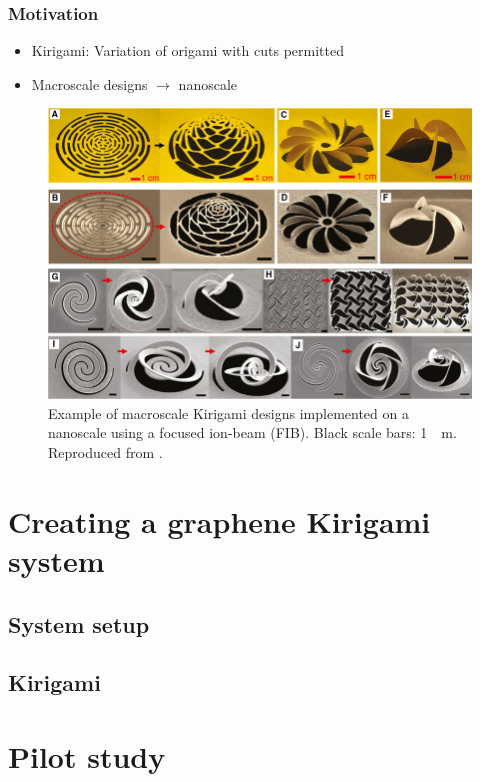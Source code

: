 \documentclass[UKenglish]{beamer}
\begin{document}
\begin{frame}
	\frametitle{Motivation}

	\begin{itemize}
		\item Kirigami: Variation of origami with cuts permitted
		\item Macroscale designs $\to$ nanoscale
	\end{itemize}
	\vspace*{10px}

	\begin{figure}
		\includegraphics[height=0.6\textheight]{figures/kirigami_example.jpg}
		\caption{Example of macroscale Kirigami designs implemented on a nanoscale using a focused ion-beam (FIB). Black scale bars: \SI{1}{\mu m}. Reproduced from \cite{Li_2018}.}
	\end{figure}	

\end{frame}

\section{Creating a graphene Kirigami system} %
\subsection{System setup}
\subsection{Kirigami}




\section{Pilot study} %
\end{document}
